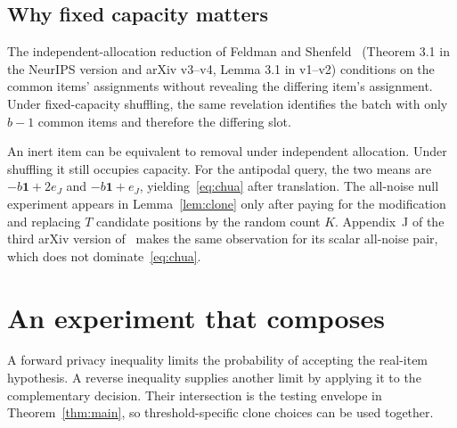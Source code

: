 \documentclass[conference]{IEEEtran}
\begin{document}
\subsection{Why fixed capacity matters}\label{sec:capacity}
The independent-allocation reduction of Feldman and Shenfeld~\cite{fs2025} (Theorem 3.1 in the NeurIPS version and arXiv v3--v4, Lemma 3.1 in v1--v2) conditions on the common items' assignments without revealing the differing item's assignment. Under fixed-capacity shuffling, the same revelation identifies the batch with only $b-1$ common items and therefore the differing slot.

An inert item can be equivalent to removal under independent allocation. Under shuffling it still occupies capacity. For the antipodal query, the two means are $-b\mathbf1+2e_J$ and $-b\mathbf1+e_J$, yielding~\eqref{eq:chua} after translation. The all-noise null experiment appears in Lemma~\ref{lem:clone} only after paying for the modification and replacing $T$ candidate positions by the random count $K$. Appendix~J of the third arXiv version of~\cite{vandijk} makes the same observation for its scalar all-noise pair, which does not dominate~\eqref{eq:chua}.

\section{An experiment that composes}\label{sec:composition}
A forward privacy inequality limits the probability of accepting the real-item hypothesis. A reverse inequality supplies another limit by applying it to the complementary decision. Their intersection is the testing envelope in Theorem~\ref{thm:main}, so threshold-specific clone choices can be used together.
\end{document}
